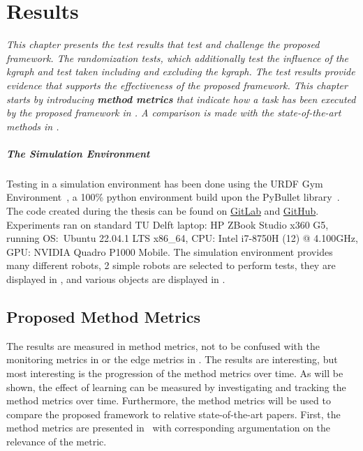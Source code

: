 \chapter{Results}%
\label{chap:results}
\textit{This chapter presents the test results that test and challenge the proposed framework.  The randomization tests, which additionally test the influence of the \ac{kgraph} and test taken including and excluding the \ac{kgraph}. The test results provide evidence that supports the effectiveness of the proposed framework. This chapter starts by introducing \textbf{method metrics} that indicate how a task has been executed by the proposed framework in . A comparison is made with the state-of-the-art methods in . \bs}

\paragraph{The Simulation Environment}
Testing in a simulation environment has been done using the URDF Gym Environment~\cite{spahn_urdfenvironment_2022}, a 100\% python environment build upon the PyBullet library~\cite{coumans_pybullet_2016}. The code created during the thesis can be found on \href{https://gitlab.tudelft.nl/airlab-delft/msc_projects/msc_gijs_groote}{GitLab} and \href{https://github.com/GijsGroote/semantic-thinking-robot}{GitHub}. Experiments ran on standard TU Delft laptop: HP ZBook Studio x360 G5, running OS:~Ubuntu 22.04.1 LTS x86\_64, CPU: Intel i7-8750H (12) @ 4.100GHz, GPU: NVIDIA Quadro P1000 Mobile.\bs
The simulation environment provides many different robots, 2 simple robots are selected to perform tests, they are displayed in , and various objects are displayed in .

\section{Proposed Method Metrics}%
\label{sec:proposed_method_metrics}
The results are measured in method metrics, not to be confused with the monitoring metrics in  or the edge metrics in . The results are interesting, but most interesting is the progression of the method metrics over time. As will be shown, the effect of learning can be measured by investigating and tracking the method metrics over time. Furthermore, the method metrics will be used to compare the proposed framework to relative state-of-the-art papers. First, the method metrics are presented in~ with corresponding argumentation on the relevance of the metric.\bs

